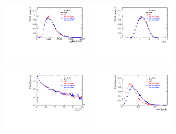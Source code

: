 %


\begin{figure}[h]
\centering
\includegraphics[height=!,width=0.4\textwidth]{figs/dataVsMC/norm_final/combined/Ds2KKpi_1_Bs_PT.pdf}
\includegraphics[height=!,width=0.4\textwidth]{figs/dataVsMC/norm_final/combined/Ds2KKpi_1_Bs_ETA.pdf}

\includegraphics[height=!,width=0.4\textwidth]{figs/dataVsMC/norm_final/combined/Ds2KKpi_1_Bs_FDCHI2_OWNPV.pdf}
\includegraphics[height=!,width=0.4\textwidth]{figs/dataVsMC/norm_final/combined/Ds2KKpi_1_NTracks.pdf}


\end{figure}
